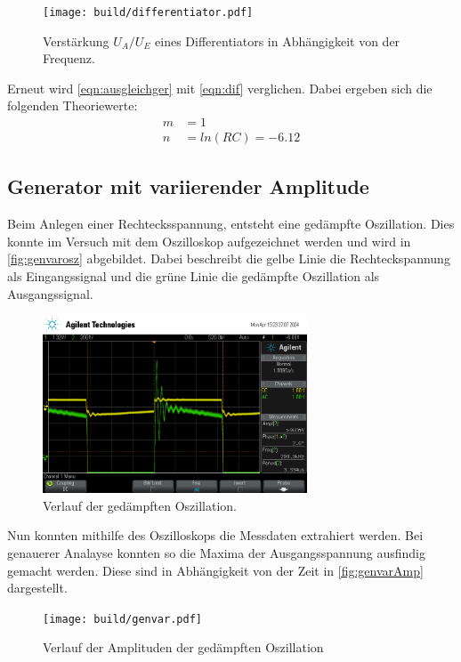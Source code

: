 \begin{figure}
    \centering
    \texttt{[image: build/differentiator.pdf]}
    \caption{Verstärkung $U_A/U_E$ eines Differentiators in Abhängigkeit von der Frequenz.}
    \label{fig:diffplot}
\end{figure}
Erneut wird \autoref{eqn:ausgleichger} mit \autoref{eqn:dif} verglichen. Dabei ergeben sich die folgenden Theoriewerte:
\begin{align*}
    m &= 1 \\
    n &= ln(RC) = -6.12
\end{align*}

\subsection{Generator mit variierender Amplitude}
Beim Anlegen einer Rechtecksspannung, entsteht eine gedämpfte Oszillation. Dies konnte im Versuch mit dem Oszilloskop aufgezeichnet werden und 
wird  in \autoref{fig:genvarosz} abgebildet. Dabei beschreibt die gelbe Linie die Rechteckspannung als Eingangssignal und die grüne Linie 
die gedämpfte Oszillation als Ausgangssignal.
\begin{figure}
    \centering
    \includegraphics[width=0.7\textwidth]{genvarplot.png}
    \caption{Verlauf der gedämpften Oszillation.}
    \label{fig:genvarosz}
\end{figure}
Nun konnten mithilfe des Oszilloskops die Messdaten extrahiert werden. Bei genauerer Analayse konnten so die Maxima der Ausgangsspannung 
ausfindig gemacht werden. Diese sind in Abhängigkeit von der Zeit in \autoref{fig:genvarAmp} dargestellt.
\begin{figure}
    \centering
    \texttt{[image: build/genvar.pdf]}
    \caption{Verlauf der Amplituden der gedämpften Oszillation}
    \label{fig:genvarAmp}
\end{figure}